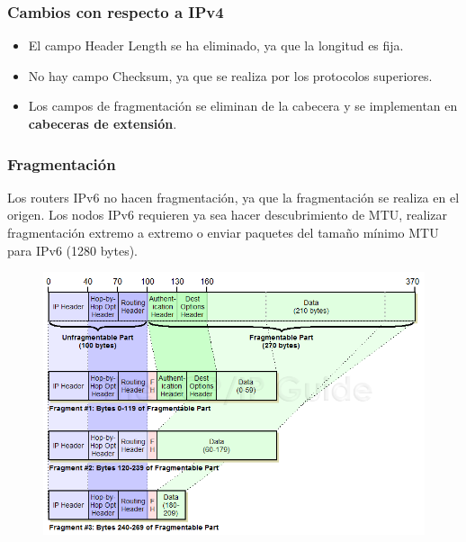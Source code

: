 \begin{onepage}
\subsubsection{Cambios con respecto a IPv4}
\begin{itemize}
    \item El campo Header Length se ha eliminado, ya que la longitud es fija.
    \item No hay campo Checksum, ya que se realiza por los protocolos superiores.
    \item Los campos de fragmentación se eliminan de la cabecera y se implementan en \textbf{cabeceras de extensión}.
\end{itemize}
\subsubsection{Fragmentación}
Los routers IPv6 no hacen fragmentación, ya que la fragmentación se realiza en el origen. Los nodos IPv6 requieren ya sea hacer descubrimiento de MTU, realizar fragmentación extremo a extremo o enviar paquetes del tamaño mínimo MTU para IPv6 (1280 bytes).\\

\begin{figure}[H]
    \centering \includegraphics[width=\textwidth]{img/ipv6_fragm.png}
\end{figure}
\end{onepage}
